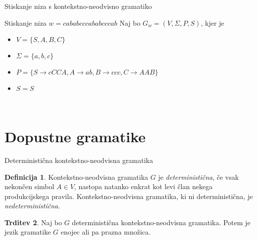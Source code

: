 \documentclass{beamer}
\theoremstyle{definition} %
\newtheorem{definicija}{Definicija}[section]
\newtheorem{trditev}[definicija]{Trditev}
\begin{document}
\begin{frame}{Stiskanje niza s kontekstno-neodvisno gramatiko}
    \begin{exampleblock}{Stiskanje niza $ w = \mathit{cababcccababcccab} $}
        Naj bo $ G_w = ( V, \Sigma, P, S ) $, kjer je 
        \begin{itemize}
            \item<2-> $ V = \{ S, A, B, C \} $
            \item<3-> $ \Sigma = \{ a, b, c \} $
            \item<4-> $ P = \{ S  \rightarrow  \mathit{cCCA}, A  \rightarrow  \mathit{ab}, B  
            \rightarrow  \mathit{ccc}, C  \rightarrow  \mathit{AAB} \} $
            \item<5-> $ S = S $
        \end{itemize}
        \pause
        \pause
        \pause
        \pause
        \pause \\
    \end{exampleblock}
\end{frame}

\section{Dopustne gramatike}

\begin{frame}{Deterministična kontekstno-neodvisna gramatika}
    \begin{definicija}
        Kontekstno-neodvisna gramatika $G$ je \textit{deterministična}, če vsak nekončen simbol $ A \in V $,
        nastopa natanko enkrat kot levi član nekega produkcijskega pravila.
        Kontekstno-neodvisna gramatika, ki ni deterministična, je \textit{nedeterministična}.
    \end{definicija}
    \pause
    \begin{trditev}
        Naj bo $G$ deterministična kontekstno-neodvisna gramatika. Potem je jezik gramatike $G$ enojec ali pa prazna množica.
    \end{trditev}
\end{frame}
\end{document}
